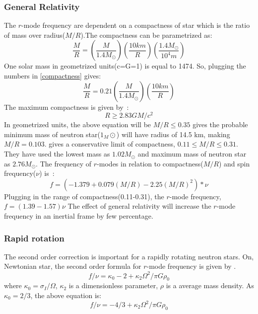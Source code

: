 \documentclass{ttuthes2007}
\begin{document}
\subsubsection{General Relativity}
The $r$-mode frequency are dependent on a compactness of star which is the ratio
of mass over radius($M/R$).The compactness can be parametrized as:
\begin{equation}\label{compactness}
\frac{M}{R}=\left(\frac{M}{1.4M_\odot}\right)\left(\frac{10km}{R}\right)\left(\frac{1.4M_\odot}{10^4m}\right)
\end{equation} 
One solar mass in geometrized units(c=G=1) is equal to 1474. So, plugging the
numbers in \ref{compactness} gives:
\begin{equation}
\frac{M}{R}=0.21\left(\frac{M}{1.4M_\odot}\right)\left(\frac{10km}{R}\right)
\end{equation} 
The maximum compactness is given by~\cite{LATTIMER_2007}:
\begin{equation}
R \geq 2.83GM/c^2
\end{equation}
In geometrized units, the above equation will be $M/R \leq 0.35$
\citet{LATTIMER_2007} gives the probable minimum mass of neutron
star($1_M\odot$) will have radius of 14.5 km, making $M/R=0.103$.
\citet{Idrisy_2015} gives a conservative limit of compactness, $0.11 \leq M/R
\leq 0.31$. They have used the lowest mass as $1.02M_\odot$ and maximum mass of
neutron star as $2.76M_\odot$. The frequency of $r$-modes in relation to
compactness($M/R$) and spin frequency($\nu$) is~\cite{Idrisy_2015}: 
\begin{equation}
f=(-1.379 + 0.079(M/R) - 2.25(M/R)^2)*\nu
\end{equation}  
Plugging in the range of compactness(0.11-0.31), the $r$-mode frequency,
$f=(1.39-1.57)\nu$
The effect of general relativity will increase the $r$-mode frequency in an
inertial frame by few percentage.

\subsubsection{Rapid rotation}
The second order correction is important for a rapidly rotating neutron stars.
On, Newtonian star, the second order formula for $r$-mode frequency is given by 
\cite{Lindblom_1999}.
\begin{equation}
f/\nu=\kappa_0 - 2 + \kappa_2 \Omega^2/\pi G \rho_0
\end{equation}
where $\kappa_0=\sigma_I/\Omega$, $\kappa_2$ is a dimensionless parameter,
$\rho$ is a average mass density.
As $\kappa_0=2/3$, the above equation is:
\begin{equation}
f/\nu = -4/3 + \kappa_2 \Omega^2/\pi G \rho_0
\end{equation}
\end{document}
